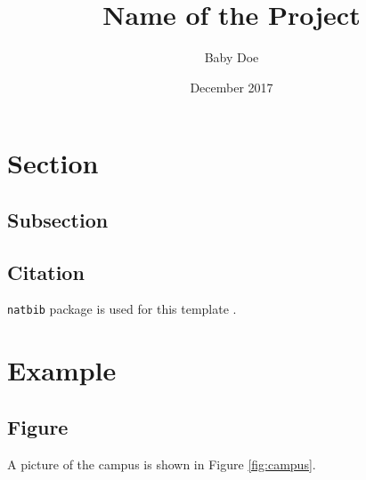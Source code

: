 \documentclass[12pt]{article}
\title{Name of the Project}
\author{Baby Doe}
\date{December 2017}
\begin{document}
\maketitle

\setcounter{tocdepth}{3}
\tableofcontents
\thispagestyle{empty}
\newpage
\listoffigures
\listoftables
\thispagestyle{empty}

\newpage
 \setcounter{page}{1}
\begin{abstract}
    \lipsum[1]
\end{abstract}

\begin{acknowledgement}
    \lipsum[2]
\end{acknowledgement}

\newpage
\section{Section}

\subsection{Subsection}
\lipsum[3]

\subsection{Citation}
\verb|natbib| package is used for this template \citep{BARRES2013275}. 

\section{Example}
\subsection{Figure}

A picture of the campus is shown in Figure \ref{fig:campus}.
\end{document}
